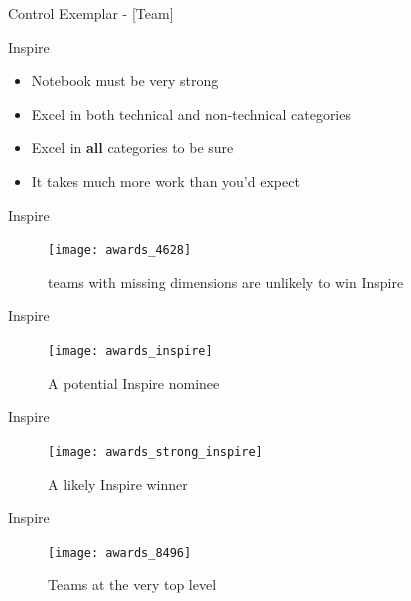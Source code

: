 \documentclass{beamer}
\begin{document}
  \begin{frame}{Control Exemplar - [Team]}
  \end{frame}

  \begin{frame}{Inspire}
    \begin{itemize}
    \item Notebook must be very strong \pause
    \item Excel in both technical and non-technical categories \pause
    \item Excel in \textbf{all} categories to be sure \pause
    \item It takes much more work than you'd expect
    \end{itemize}
  \end{frame}

  \begin{frame}{Inspire}
    \begin{center}
      \begin{figure}
        \texttt{[image: awards\_4628]}
        \caption{teams with missing dimensions are unlikely to win Inspire}
        \label{}
      \end{figure}
    \end{center}
  \end{frame}

  \begin{frame}{Inspire}
    \begin{center}
      \begin{figure}
        \texttt{[image: awards\_inspire]}
        \caption{A potential Inspire nominee}
      \end{figure}
    \end{center}
  \end{frame}

  \begin{frame}{Inspire}
    \begin{center}
      \begin{figure}
        \texttt{[image: awards\_strong\_inspire]}
        \caption{A likely Inspire winner}
      \end{figure}
    \end{center}
  \end{frame}

  \begin{frame}{Inspire}
    \begin{center}
      \begin{figure}
        \texttt{[image: awards\_8496]}
        \caption{Teams at the very top level}
      \end{figure}
    \end{center}
  \end{frame}
\end{document}
